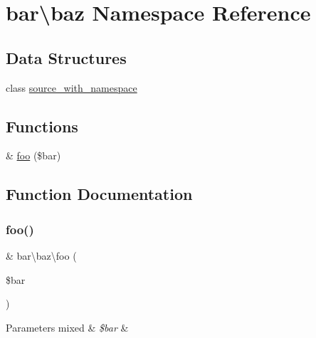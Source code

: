 \hypertarget{namespacebar_1_1baz}{}\section{bar\textbackslash{}baz Namespace Reference}
\label{namespacebar_1_1baz}
\subsection*{Data Structures}
\begin{DoxyCompactItemize}
\item 
class \mbox{\hyperlink{classbar_1_1baz_1_1source__with__namespace}{source\+\_\+with\+\_\+namespace}}
\end{DoxyCompactItemize}
\subsection*{Functions}
\begin{DoxyCompactItemize}
\item 
\& \mbox{\hyperlink{namespacebar_1_1baz_a18d1f863c3b8d8a292b6274fb4a93ae5}{foo}} (\$bar)
\end{DoxyCompactItemize}


\subsection{Function Documentation}
\mbox{\label{namespacebar_1_1baz_a18d1f863c3b8d8a292b6274fb4a93ae5}} 
\subsubsection{\texorpdfstring{foo()}{foo()}}
{\footnotesize\ttfamily \& bar\textbackslash{}baz\textbackslash{}foo (\begin{DoxyParamCaption}\item[{}]{\$bar }\end{DoxyParamCaption})}


\begin{DoxyParams}[1]{Parameters}
mixed & {\em \$bar} & \\
\hline
\end{DoxyParams}
